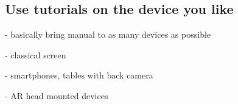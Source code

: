 		\subsection{Use tutorials on the device you like}
		
			- basically bring manual to as many devices as possible
			
			- classical screen
			
			- smartphones, tables with back camera
			
			- AR head mounted devices

	

%
%
